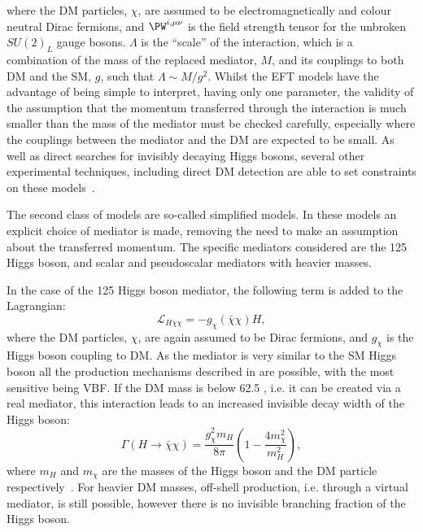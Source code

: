 where the \ac{DM} particles, $\chi$, are assumed to be electromagnetically and colour neutral Dirac fermions, and $\PW^{i,\mu\nu}$ is the field strength tensor for the unbroken $SU\!\left(2\right)_{L}$ gauge bosons. $\Lambda$ is the ``scale'' of the interaction, which is a combination of the mass of the replaced mediator, $M$, and its couplings to both \ac{DM} and the \ac{SM}, $g$, such that $\Lambda\sim M/g^{2}$. Whilst the \ac{EFT} models have the advantage of being simple to interpret, having only one parameter, the validity of the assumption that the momentum transferred through the interaction is much smaller than the mass of the mediator must be checked carefully, especially where the couplings between the mediator and the \ac{DM} are expected to be small. As well as direct searches for invisibly decaying Higgs bosons, several other experimental techniques, including direct \ac{DM} detection are able to set constraints on these models~\cite{ourdmpaper}.%

The second class of models are so-called simplified models. In these models an explicit choice of mediator is made, removing the need to make an assumption about the transferred momentum. The specific mediators considered are the 125 \GeV Higgs boson, and scalar and pseudoscalar mediators with heavier masses.

In the case of the 125 \GeV Higgs boson mediator, the following term is added to the Lagrangian:
\begin{equation}
  \mathcal{L}_{H\chi\chi}=-g_{\chi}\left(\bar{\chi}\chi\right)H,
\end{equation}
where the \ac{DM} particles, $\chi$, are again assumed to be Dirac fermions, and $g_{\chi}$ is the Higgs boson coupling to \ac{DM}. As the mediator is very similar to the \ac{SM} Higgs boson all the production mechanisms described in  are possible, with the most sensitive being \ac{VBF}. If the \ac{DM} mass is below 62.5 \GeV, i.e. it can be created via a real mediator, this interaction leads to an increased invisible decay width of the Higgs boson:
\begin{equation}
  \label{eq:offshellsmhiggs}
  \Gamma\left(H\rightarrow\bar{\chi}\chi\right)=\frac{g_{\chi}^{2}m_{H}}{8\pi}\left(1-\frac{4m_{\chi}^{2}}{m_{H}^{2}}\right),
\end{equation}
where $m_{H}$ and $m_{\chi}$ are the masses of the Higgs boson and the \ac{DM} particle respectively~\cite{ourdmpaper}. For heavier \ac{DM} masses, off-shell production, i.e. through a virtual mediator, is still possible, however there is no invisible branching fraction of the Higgs boson.

